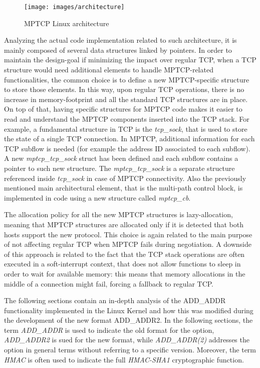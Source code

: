 \begin{figure}[!htb]
\centering
\texttt{[image: images/architecture]}
\caption{MPTCP Linux architecture}
\label{fig:architecture}
\end{figure}

Analyzing the actual code implementation related to such architecture, it is mainly composed of several data structures linked by pointers. In order to maintain the design-goal if minimizing the impact over regular TCP, when a TCP structure would need additional elements to handle MPTCP-related functionalities, the common choice is to define a new MPTCP-specific structure to store those elements. In this way, upon regular TCP operations, there is no increase in memory-footprint and all the standard TCP structures are in place. On top of that, having specific structures for MPTCP code makes it easier to read and understand the MPTCP components inserted into the TCP stack. For example, a fundamental structure in TCP is the \textit{tcp\_sock}, that is used to store the state of a single TCP connection. In MPTCP, additional information for each TCP subflow is needed (for example the address ID associated to each subflow). A new \textit{mptcp\_tcp\_sock} struct has been defined and each subflow contains a pointer to such new structure. The \textit{mptcp\_tcp\_sock} is a separate structure referenced inside \textit{tcp\_sock} in case of MPTCP connectivity.
Also the previously mentioned main architectural element, that is the multi-path control block, is implemented in code using a new structure called \textit{mptcp\_cb}.

The allocation policy for all the new MPTCP structures is lazy-allocation, meaning that MPTCP structures are allocated only if it is detected that both hosts support the new protocol. This choice is again related to the main purpose of not affecting regular TCP when MPTCP fails during negotiation. A downside of this approach is related to the fact that the TCP stack operations are often executed in a soft-interrupt context, that does not allow functions to sleep in order to wait for available memory: this means that memory allocations in the middle of a connection might fail, forcing a fallback to regular TCP. 

The following sections contain an in-depth analysis of the ADD\_ADDR functionality implemented in the Linux Kernel and how this was modified during the development of the new format ADD\_ADDR2. In the following sections, the term \textit{ADD\_ADDR} is used to indicate the old format for the option, \textit{ADD\_ADDR2} is sued for the new format, while \textit{ADD\_ADDR(2)} addresses the option in general terms without referring to a specific version. Moreover, the term \textit{HMAC} is often used to indicate the full \textit{HMAC-SHA1} cryptographic function.

